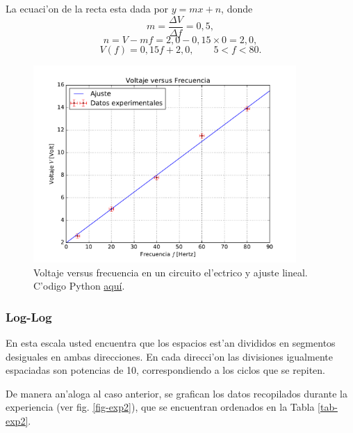 La ecuaci'on de la recta esta dada por $y=mx+n$, donde 
\begin{equation}
m=\frac{\Delta V}{\Delta f}=0,5,
\end{equation}
\begin{equation}
n=V-mf=2,0-0,15\times 0=2,0,
\end{equation}
\begin{equation}
V(f)=0,15 f +2,0, \qquad 5<f<80.
\end{equation}
\begin{figure}[h!]
\begin{center}
\includegraphics[width=10cm]{figs/fig-ajuste-lineal.pdf}
\caption{Voltaje versus frecuencia en un circuito el'ectrico y ajuste lineal.  C'odigo Python \href{https://github.com/gfrubi/Lab/blob/master/python/fig-ajuste-lineal.py}{aqu\'i}.}
\end{center}
\label{fig-exp1}
\end{figure}

\subsubsection{Log-Log}
En esta escala usted encuentra que los espacios est'an divididos en segmentos desiguales en ambas direcciones. En cada direcci'on las divisiones igualmente espaciadas son potencias de 10, correspondiendo a los ciclos que se repiten.

De manera an'aloga al caso anterior, se grafican los datos recopilados durante la experiencia (ver fig. \ref{fig-exp2}), que se encuentran ordenados en la Tabla \ref{tab-exp2}. 


